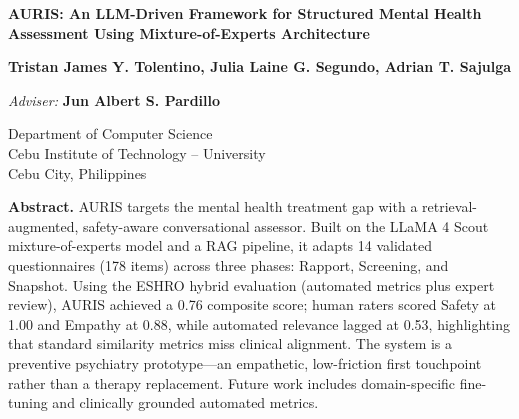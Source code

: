 \documentclass[12pt]{article}
\begin{document}
\begin{center}
    {\Large \textbf{AURIS: An LLM-Driven Framework for Structured Mental Health Assessment Using Mixture-of-Experts Architecture}}

    \vspace{1.5em}

    \textbf{Tristan James Y. Tolentino, Julia Laine G. Segundo, Adrian T. Sajulga}

    \vspace{0.5em}

    \textit{Adviser:} \textbf{Jun Albert S. Pardillo}

    \vspace{0.5em}

    Department of Computer Science \\
    Cebu Institute of Technology -- University \\
    Cebu City, Philippines
\end{center}

\vspace{2em}

\noindent\textbf{Abstract.}
AURIS targets the mental health treatment gap with a retrieval-augmented, safety-aware conversational assessor. Built on the LLaMA 4 Scout mixture-of-experts model and a RAG pipeline, it adapts 14 validated questionnaires (178 items) across three phases: Rapport, Screening, and Snapshot. Using the ESHRO hybrid evaluation (automated metrics plus expert review), AURIS achieved a 0.76 composite score; human raters scored Safety at 1.00 and Empathy at 0.88, while automated relevance lagged at 0.53, highlighting that standard similarity metrics miss clinical alignment. The system is a preventive psychiatry prototype---an empathetic, low-friction first touchpoint rather than a therapy replacement. Future work includes domain-specific fine-tuning and clinically grounded automated metrics.
\end{document}
